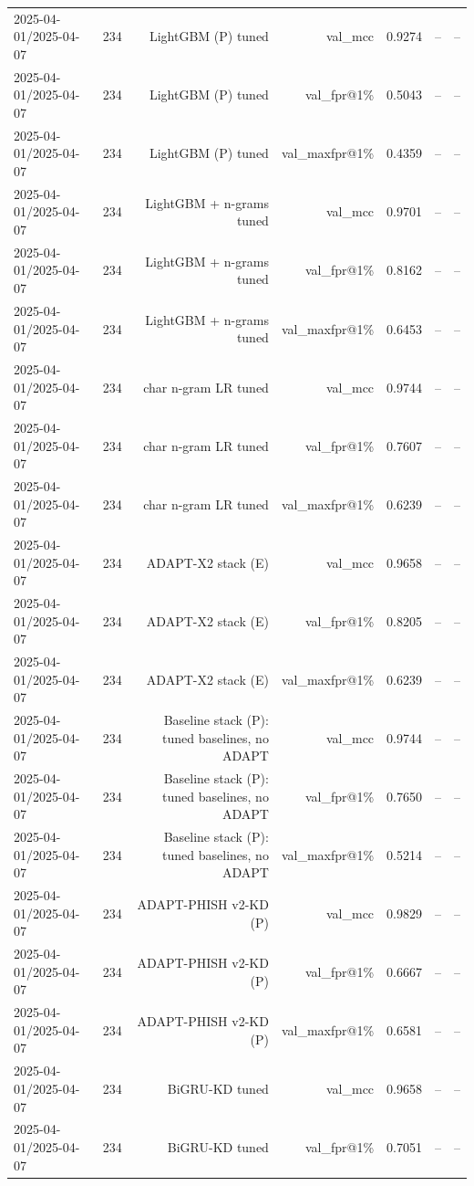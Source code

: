 \begin{table}[t]
\begin{tabular}{llrrrrr}
2025-04-01/2025-04-07 & 234 & LightGBM (P) tuned & val\_mcc & 0.9274 & -- & -- \\
2025-04-01/2025-04-07 & 234 & LightGBM (P) tuned & val\_fpr@1\% & 0.5043 & -- & -- \\
2025-04-01/2025-04-07 & 234 & LightGBM (P) tuned & val\_maxfpr@1\% & 0.4359 & -- & -- \\
2025-04-01/2025-04-07 & 234 & LightGBM + n-grams tuned & val\_mcc & 0.9701 & -- & -- \\
2025-04-01/2025-04-07 & 234 & LightGBM + n-grams tuned & val\_fpr@1\% & 0.8162 & -- & -- \\
2025-04-01/2025-04-07 & 234 & LightGBM + n-grams tuned & val\_maxfpr@1\% & 0.6453 & -- & -- \\
2025-04-01/2025-04-07 & 234 & char n-gram LR tuned & val\_mcc & 0.9744 & -- & -- \\
2025-04-01/2025-04-07 & 234 & char n-gram LR tuned & val\_fpr@1\% & 0.7607 & -- & -- \\
2025-04-01/2025-04-07 & 234 & char n-gram LR tuned & val\_maxfpr@1\% & 0.6239 & -- & -- \\
2025-04-01/2025-04-07 & 234 & ADAPT-X2 stack (E) & val\_mcc & 0.9658 & -- & -- \\
2025-04-01/2025-04-07 & 234 & ADAPT-X2 stack (E) & val\_fpr@1\% & 0.8205 & -- & -- \\
2025-04-01/2025-04-07 & 234 & ADAPT-X2 stack (E) & val\_maxfpr@1\% & 0.6239 & -- & -- \\
2025-04-01/2025-04-07 & 234 & Baseline stack (P): tuned baselines, no ADAPT & val\_mcc & 0.9744 & -- & -- \\
2025-04-01/2025-04-07 & 234 & Baseline stack (P): tuned baselines, no ADAPT & val\_fpr@1\% & 0.7650 & -- & -- \\
2025-04-01/2025-04-07 & 234 & Baseline stack (P): tuned baselines, no ADAPT & val\_maxfpr@1\% & 0.5214 & -- & -- \\
2025-04-01/2025-04-07 & 234 & ADAPT-PHISH v2-KD (P) & val\_mcc & 0.9829 & -- & -- \\
2025-04-01/2025-04-07 & 234 & ADAPT-PHISH v2-KD (P) & val\_fpr@1\% & 0.6667 & -- & -- \\
2025-04-01/2025-04-07 & 234 & ADAPT-PHISH v2-KD (P) & val\_maxfpr@1\% & 0.6581 & -- & -- \\
2025-04-01/2025-04-07 & 234 & BiGRU-KD tuned & val\_mcc & 0.9658 & -- & -- \\
2025-04-01/2025-04-07 & 234 & BiGRU-KD tuned & val\_fpr@1\% & 0.7051 & -- & -- \\

\end{tabular}
\end{table}
